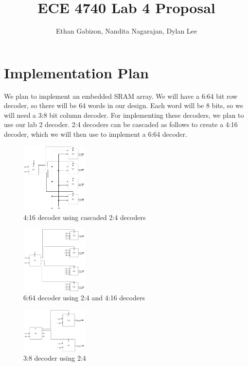 \documentclass{article}
\title{ECE 4740 Lab 4 Proposal}
\author{Ethan Gabizon, Nandita Nagarajan, Dylan Lee}
\begin{document}
\maketitle

\section{Implementation Plan}
We plan to implement an embedded SRAM array. We will have a 6:64 bit row decoder, so there will be 64 words in our design.
Each word will be 8 bits, so we will need a 3:8 bit column decoder. For implementing these decoders, we plan to use our lab 2
decoder. 2:4 decoders can be cascaded as follows to create a 4:16 decoder, which we will then use to implement a 6:64 decoder.

\begin{figure}[h]
    \caption{4:16 decoder using cascaded 2:4 decoders}
    \centering
    \includegraphics[width=0.3\textwidth]{4_16decoder.drawio.png}
\end{figure}

\begin{figure}[h]
    \caption{6:64 decoder using 2:4 and 4:16 decoders}
    \centering
    \includegraphics[width=0.3\textwidth]{6_64decoder.drawio.png}
\end{figure}

\begin{figure}[h]
    \caption{3:8 decoder using 2:4}
    \centering
    \includegraphics[width=0.3\textwidth]{3_8decoder.drawio.png}
\end{figure}
\end{document}
